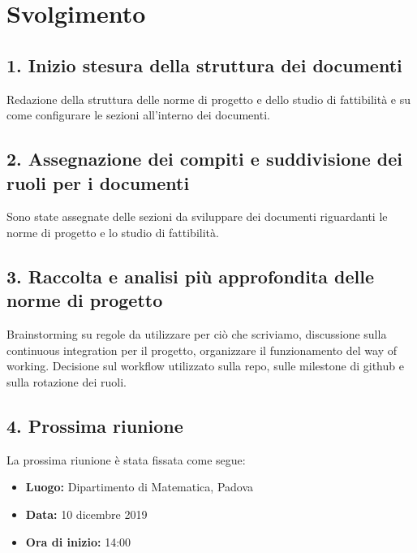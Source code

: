 \newpage
\section*{Svolgimento}

\subsection*{1. Inizio stesura della struttura dei documenti }

Redazione della struttura delle norme di progetto e dello studio di fattibilità e su come configurare le sezioni all'interno dei documenti.

\subsection*{2. Assegnazione dei compiti e suddivisione dei ruoli per i documenti }

Sono state assegnate delle sezioni da sviluppare dei documenti riguardanti le norme di progetto e lo studio di fattibilità.

\subsection*{3. Raccolta e analisi più approfondita delle norme di progetto }

Brainstorming su regole da utilizzare per ciò che scriviamo, discussione sulla continuous integration per il progetto, organizzare il funzionamento del way of working. Decisione sul workflow utilizzato sulla repo, sulle milestone di github e sulla rotazione dei ruoli.

\subsection*{4. Prossima riunione}

La prossima riunione è stata fissata come segue:
\begin{itemize}
	\item \textbf{Luogo:} Dipartimento di Matematica, Padova
	\item \textbf{Data:} 10 dicembre 2019
	\item \textbf{Ora di inizio:} 14:00
\end{itemize}
